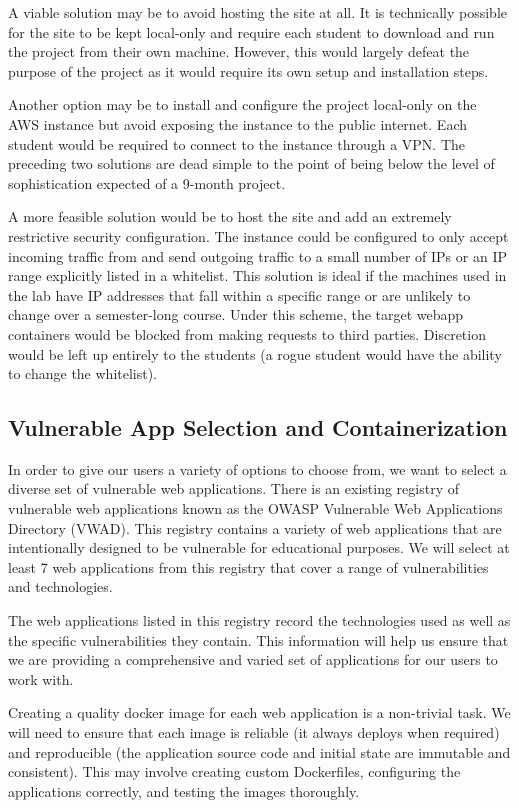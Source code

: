 \documentclass[12pt,titlepage]{article}
\begin{document}
A viable solution may be to avoid hosting the site at all. It is technically possible for the site to be kept local-only and require each student to download and run the project from their own machine. However, this would largely defeat the purpose of the project as it would require its own setup and installation steps.

Another option may be to install and configure the project local-only on the AWS instance but avoid exposing the instance to the public internet. Each student would be required to connect to the instance through a VPN. The preceding two solutions are dead simple to the point of being below the level of sophistication expected of a 9-month project.

A more feasible solution would be to host the site and add an extremely restrictive security configuration. The instance could be configured to only accept incoming traffic from and send outgoing traffic to a small number of IPs or an IP range explicitly listed in a whitelist. This solution is ideal if the machines used in the lab have IP addresses that fall within a specific range or are unlikely to change over a semester-long course. Under this scheme, the target webapp containers would be blocked from making requests to third parties. Discretion would be left up entirely to the students (a rogue student would have the ability to change the whitelist).

\subsection{Vulnerable App Selection and Containerization}
In order to give our users a variety of options to choose from, we want to select a diverse set of vulnerable web applications. There is an existing registry of vulnerable web applications known as the OWASP Vulnerable Web Applications Directory (VWAD). This registry contains a variety of web applications that are intentionally designed to be vulnerable for educational purposes. We will select at least 7 web applications from this registry that cover a range of vulnerabilities and technologies.

The web applications listed in this registry record the technologies used as well as the specific vulnerabilities they contain. This information will help us ensure that we are providing a comprehensive and varied set of applications for our users to work with.

Creating a quality docker image for each web application is a non-trivial task. We will need to ensure that each image is reliable (it always deploys when required) and reproducible (the application source code and initial state are immutable and consistent). This may involve creating custom Dockerfiles, configuring the applications correctly, and testing the images thoroughly.
\end{document}
